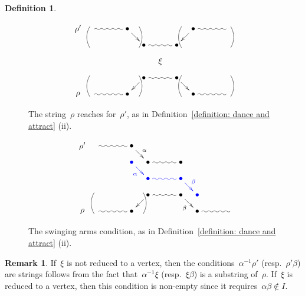 \documentclass{amsart}
\theoremstyle{definition}
\newtheorem{definition}[theorem]{Definition}
\newtheorem{remark}[theorem]{Remark}
\begin{document}
\begin{definition}
\begin{figure}[t]
 	\capstart
\[
\xy
%
(-35,14)*+{\rho'};
(-28,14)="-14";
(-14,14)*+{\bullet}="-12";
(-7,7)*+{\bullet}="-11";
(7,7)*+{\bullet}="11";
(14,14)*+{\bullet}="12";
(28,14)="14";
%
(0,0)*+{\xi};
%
(-35,-14)*+{\rho};
(-28,-14)="-4";
(-14,-14)*+{\bullet}="-2";
(-7,-7)*+{\bullet}="-1";
(7,-7)*+{\bullet}="1";
(14,-14)*+{\bullet}="2";
(28,-14)="4";
%
{\ar@{~} "-14";"-12"};
{\ar "-12";"-11"};
{\ar@{~} "-11";"11"};
{\ar "12";"11"};
{\ar@{~} "12";"14"};
%
{\ar@/_.3pc/@{-} (-30,15);(-30,6)};
{\ar@/^.3pc/@{-} (-9,15);(-9,6)};
%
{\ar@/^.3pc/@{-} (30,15);(30,6)};
{\ar@/_.3pc/@{-} (9,15);(9,6)};
%
{\ar@/^.3pc/@{-} (-30,-15);(-30,-6)};
{\ar@/_.3pc/@{-} (-9,-15);(-9,-6)};
%
{\ar@/_.3pc/@{-} (30,-15);(30,-6)};
{\ar@/^.3pc/@{-} (9,-15);(9,-6)};
%
{\ar@{~} "-4";"-2"};
{\ar "-1";"-2"};
{\ar@{~} "-1";"1"};
{\ar "1";"2"};
{\ar@{~} "2";"4"};
%
\endxy
\]
	\caption{The string~$\rho$ reaches for~$\rho'$, as in Definition~\ref{definition: dance and attract} (ii).}
	\label{fig:def-dances}
\end{figure}

\begin{figure}[t]
 	\capstart
\[
\xy
%
(-35,14)*+{\rho'};
(-28,14)="-14";
(-14,14)*+{\bullet}="-12";
(-7,7)*+{\bullet}="-11";
(7,7)*+{\bullet}="11";
%
(-14,7)*+{\textcolor{blue}{\bullet}}="a";
(-7,0)*+{\textcolor{blue}{\bullet}}="b";
(7,0)*+{\textcolor{blue}{\bullet}}="c";
(14,-7)*+{\textcolor{blue}{\bullet}}="d";
%
(-35,-14)*+{\rho};
(-28,-14)="-4";
(-14,-14)*+{\bullet}="-2";
(-7,-7)*+{\bullet}="-1";
(7,-7)*+{\bullet}="1";
(14,-14)*+{\bullet}="2";
(28,-14)="4";
%
{\ar@{~} "-14";"-12"};
{\ar^\alpha "-12";"-11"};
{\ar@{~} "-11";"11"};
%
{\ar@/^.3pc/@{-} (-30,-15);(-30,-6)};
{\ar@/_.3pc/@{-} (-9,-15);(-9,-6)};
%
{\ar@{~} "-4";"-2"};
{\ar "-1";"-2"};
{\ar@{~} "-1";"1"};
{\ar_\beta "1";"2"};
{\ar@{~} "2";"4"};
%
{\textcolor{blue}{\ar_\alpha "a";"b"}};
{\textcolor{blue}{\ar@{~} "b";"c"}};
{\textcolor{blue}{\ar^\beta "c";"d"}};
%
\endxy
\]
	\caption{The swinging arms condition, as in Definition~\ref{definition: dance and attract} (ii).}
	\label{fig: swinging arms}
\end{figure}
\end{definition}

\begin{remark}
If~$\xi$ is not reduced to a vertex, then the conditions~$\alpha^{-1}\rho'$ (resp.~$\rho'\beta$) are strings follows from the fact that~$\alpha^{-1}\xi$ (resp.~$\xi\beta$) is a substring of~$\rho$. If~$\xi$ is reduced to a vertex, then this condition is non-empty since it requires~$\alpha\beta \notin I$.
\end{remark}
\end{document}
